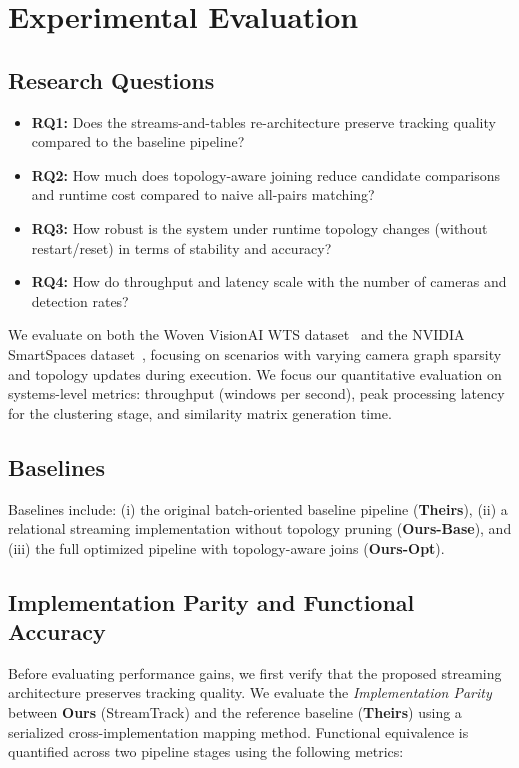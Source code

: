 \documentclass[review]{elsarticle}
\begin{document}
\section{Experimental Evaluation}\label{sec:evaluation}

\subsection{Research Questions}

\begin{itemize}[leftmargin=*]
    \item \textbf{RQ1:} Does the streams-and-tables re-architecture preserve tracking quality compared to the baseline pipeline?
    \item \textbf{RQ2:} How much does topology-aware joining reduce candidate comparisons and runtime cost compared to naive all-pairs matching?
    \item \textbf{RQ3:} How robust is the system under runtime topology changes (without restart/reset) in terms of stability and accuracy?
    \item \textbf{RQ4:} How do throughput and latency scale with the number of cameras and detection rates?
\end{itemize}
We evaluate on both the Woven VisionAI WTS dataset~\cite{kong2024wts} and the NVIDIA SmartSpaces dataset~\cite{aicity2025track1}, focusing on scenarios with varying camera graph sparsity and topology updates during execution. We focus our quantitative evaluation on systems-level metrics: throughput (windows per second), peak processing latency for the clustering stage, and similarity matrix generation time.

\subsection{Baselines}

Baselines include: (i) the original batch-oriented baseline pipeline (\textbf{Theirs}), (ii) a relational streaming implementation without topology pruning (\textbf{Ours-Base}), and (iii) the full optimized pipeline with topology-aware joins (\textbf{Ours-Opt}).

\subsection{Implementation Parity and Functional Accuracy}
Before evaluating performance gains, we first verify that the proposed streaming architecture preserves tracking quality. We evaluate the \emph{Implementation Parity} between \textbf{Ours} (StreamTrack) and the reference baseline (\textbf{Theirs}) using a serialized cross-implementation mapping method. Functional equivalence is quantified across two pipeline stages using the following metrics:
\end{document}
